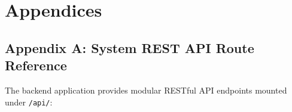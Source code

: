 \documentclass[12pt,a4paper]{report}
\begin{document}



\chapter*{Appendices}
\section*{Appendix A: System REST API Route Reference}

The backend application provides modular RESTful API endpoints mounted under \texttt{/api/}:
\end{document}
